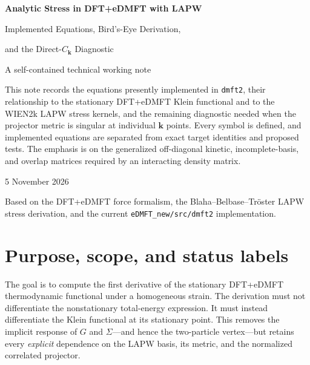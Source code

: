 \documentclass[11pt]{article}
\numberwithin{equation}{section}
\newcommand{\kb}{\mathbf k}
\newcommand{\code}[1]{\texttt{#1}}
\begin{document}
\begin{titlepage}
\centering
\vspace*{22mm}
{\Huge\bfseries\color{navy}Analytic Stress in DFT+eDMFT with LAPW\par}
\vspace{7mm}
{\LARGE Implemented Equations, Bird's-Eye Derivation,\par
and the Direct-$C_{\kb}$ Diagnostic\par}
\vspace{13mm}
{\large A self-contained technical working note\par}
\vspace{18mm}
\begin{minipage}{0.86\textwidth}
\small
This note records the equations presently implemented in \code{dmft2}, their
relationship to the stationary DFT+eDMFT Klein functional and to the WIEN2k
LAPW stress kernels, and the remaining diagnostic needed when the projector
metric is singular at individual $\kb$ points.  Every symbol is defined, and
implemented equations are separated from exact target identities and proposed
tests.  The emphasis is on the generalized off-diagonal kinetic,
incomplete-basis, and overlap matrices required by an interacting density
matrix.
\end{minipage}
\vfill
{\large 5 November 2026\par}
\vspace{7mm}
{\small Based on the DFT+eDMFT force formalism, the Blaha--Belbase--Tr\"oster
LAPW stress derivation, and the current \code{eDMFT\_new/src/dmft2} implementation.\par}
\end{titlepage}

\tableofcontents
\clearpage

\section{Purpose, scope, and status labels}

The goal is to compute the first derivative of the stationary DFT+eDMFT
thermodynamic functional under a homogeneous strain.  The derivation must not
differentiate the nonstationary total-energy expression.  It must instead
differentiate the Klein functional at its stationary point.  This removes the
implicit response of $G$ and $\Sigma$---and hence the two-particle vertex---but
retains every \emph{explicit} dependence on the LAPW basis, its metric, and the
normalized correlated projector.
\end{document}
